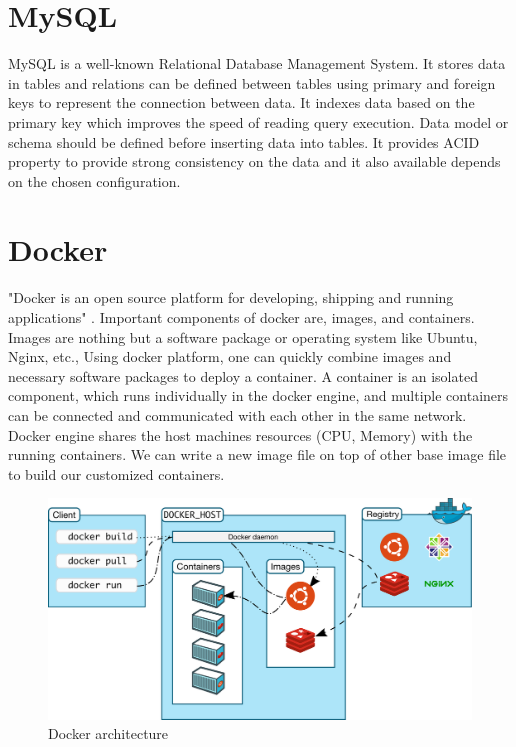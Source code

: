 	\section{MySQL}
	MySQL is a well-known Relational Database Management System. It stores data in tables and relations can be defined between tables using primary and foreign keys to represent the connection between data. It indexes data based on the primary key which improves the speed of reading query execution. Data model or schema should be defined before inserting data into tables. It provides ACID property to provide strong consistency on the data and it also available depends on the chosen configuration.
	
	\section{Docker}
	"Docker is an open source platform for developing, shipping and running applications" \cite{misc11}. Important components of docker are, images, and containers. Images are nothing but a software package or operating system like Ubuntu, Nginx, etc., Using docker platform, one can quickly combine images and necessary software packages to deploy a container. A container is an isolated component, which runs individually in the docker engine, and multiple containers can be connected and communicated with each other in the same network. Docker engine shares the host machines resources (CPU, Memory) with the running containers. We can write a new image file on top of other base image file to build our customized containers.
	
	\begin{figure}[!htbp] 
		\begin{center}
			\includegraphics[scale=0.04]{./images/png/docker_architecture}	
			\caption{Docker architecture \cite{misc14}}	
			\label{fig:docker_architecture}	
		\end{center}
	\end{figure}


